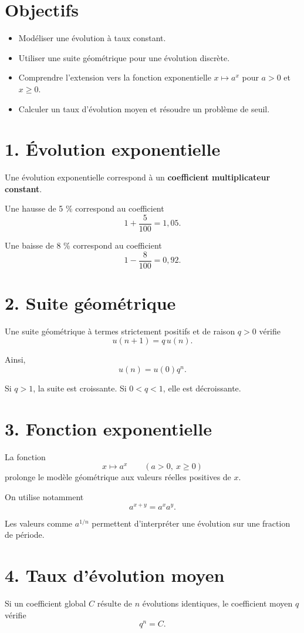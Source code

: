 \section{Objectifs}
\begin{itemize}
\item Modéliser une évolution à taux constant.
\item Utiliser une suite géométrique pour une évolution discrète.
\item Comprendre l'extension vers la fonction exponentielle $x\mapsto a^x$ pour $a>0$ et $x\ge0$.
\item Calculer un taux d'évolution moyen et résoudre un problème de seuil.
\end{itemize}

\section{1. Évolution exponentielle}
Une évolution exponentielle correspond à un \textbf{coefficient multiplicateur constant}.

Une hausse de 5 \% correspond au coefficient
\[
1+\frac{5}{100}=1{,}05.
\]

Une baisse de 8 \% correspond au coefficient
\[
1-\frac{8}{100}=0{,}92.
\]

\section{2. Suite géométrique}
Une suite géométrique à termes strictement positifs et de raison $q>0$ vérifie
\[
u(n+1)=q\,u(n).
\]

Ainsi,
\[
u(n)=u(0)q^n.
\]

Si $q>1$, la suite est croissante. Si $0<q<1$, elle est décroissante.

\section{3. Fonction exponentielle}
La fonction
\[
x\mapsto a^x\qquad(a>0,\ x\ge0)
\]
prolonge le modèle géométrique aux valeurs réelles positives de $x$.

On utilise notamment
\[
a^{x+y}=a^x a^y.
\]

Les valeurs comme $a^{1/n}$ permettent d'interpréter une évolution sur une fraction de période.

\section{4. Taux d'évolution moyen}
Si un coefficient global $C$ résulte de $n$ évolutions identiques, le coefficient moyen $q$ vérifie
\[
q^n=C.
\]

